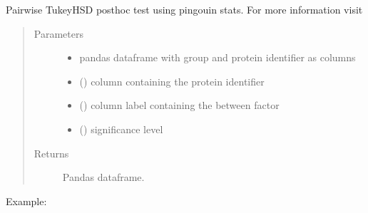 \documentclass[letterpaper,10pt,english]{sphinxmanual}
\begin{document}
\begin{fulllineitems}
\label{\detokenize{_autosummary/analytics_core.analytics:analytics_core.analytics.analytics.calculate_THSD}}
Pairwise Tukey\sphinxhyphen{}HSD posthoc test using pingouin stats. For more information visit 
\begin{quote}\begin{description}
\item[{Parameters}] \leavevmode\begin{itemize}
\item {} 
 \textendash{} pandas dataframe with group and protein identifier as columns

\item {} 
 () \textendash{} column containing the protein identifier

\item {} 
 () \textendash{} column label containing the between factor

\item {} 
 () \textendash{} significance level

\end{itemize}

\item[{Returns}] \leavevmode
Pandas dataframe.

\end{description}\end{quote}

Example:

\begin{sphinxVerbatim}[commandchars=\\\{\}]
     
\end{sphinxVerbatim}

\end{fulllineitems}
\end{document}
